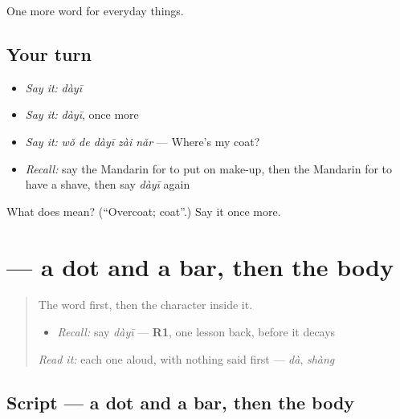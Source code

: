 \begin{grammarlens}[title={What you've built}]
One more word for everyday things.
\end{grammarlens}

\subsection*{Your turn}
\begin{itemize}
\raggedright
  \item \emph{Say it:} \emph{dàyī}
  \item \emph{Say it:} \emph{dàyī}, once more
  \item \emph{Say it:} \emph{wǒ de dàyī zài nǎr} — Where's my coat?
  \item \emph{Recall:} say the Mandarin for to put on make-up, then the Mandarin for to have a shave, then say \emph{dàyī} again
\end{itemize}

\begin{tcolorbox}[breakable,colback=teal!4,colframe=teal!35!black,title={Before you move on}]
What does  mean? (\textquotedblleft{}Overcoat; coat\textquotedblright{}.) Say it once more.
\end{tcolorbox}
\section[\texorpdfstring{\zh{衣} (yī)}{衣 (yī)}]{ — a dot and a bar, then the body}

\label{lesson:ZH-W165-yi-clothes}



\begin{quote}
The word first, then the character inside it.

\begin{itemize}
\raggedright
  \item \emph{Recall:} say \emph{dàyī} — \textbf{R1}, one lesson back, before it decays
\end{itemize}

\begin{quote}
 
\end{quote}

\emph{Read it:} each one aloud, with nothing said first — \emph{dà}, \emph{shàng}
\end{quote}

\subsection*{Script — a dot and a bar, then the body}

